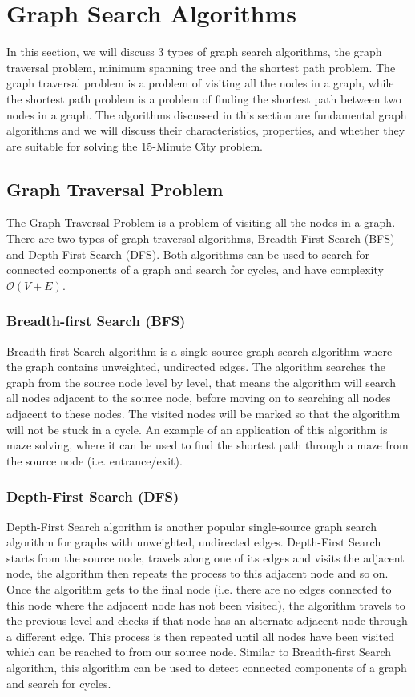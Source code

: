\section{Graph Search Algorithms}

In this section, we will discuss 3 types of graph search algorithms, the graph traversal problem, minimum spanning tree and the shortest path problem. The graph traversal problem is a problem of visiting all the nodes in a graph, while the shortest path problem is a problem of finding the shortest path between two nodes in a graph. The algorithms discussed in this section are fundamental graph algorithms and we will discuss their characteristics, properties, and whether they are suitable for solving the 15-Minute City problem.

\subsection{Graph Traversal Problem}

The Graph Traversal Problem is a problem of visiting all the nodes in a graph. There are two types of graph traversal algorithms, Breadth-First Search (BFS) and Depth-First Search (DFS). Both algorithms can be used to search for connected components of a graph and search for cycles, and have complexity $\mathcal{O}(V+E)$.

\subsubsection{Breadth-first Search (BFS)}

Breadth-first Search algorithm is a single-source graph search algorithm where the graph contains unweighted, undirected edges. The algorithm searches the graph from the source node level by level, that means the algorithm will search all nodes adjacent to the source node, before moving on to searching all nodes adjacent to these nodes. The visited nodes will be marked so that the algorithm will not be stuck in a cycle. An example of an application of this algorithm is maze solving, where it can be used to find the shortest path through a maze from the source node (i.e. entrance/exit).

\subsubsection{Depth-First Search (DFS)}

Depth-First Search algorithm is another popular single-source graph search algorithm for graphs with unweighted, undirected edges. Depth-First Search starts from the source node, travels along one of its edges and visits the adjacent node, the algorithm then repeats the process to this adjacent node and so on. Once the algorithm gets to the final node (i.e. there are no edges connected to this node where the adjacent node has not been visited), the algorithm travels to the previous level and checks if that node has an alternate adjacent node through a different edge. This process is then repeated until all nodes have been visited which can be reached to from our source node. Similar to Breadth-first Search algorithm, this algorithm can be used to detect connected components of a graph and search for cycles.

